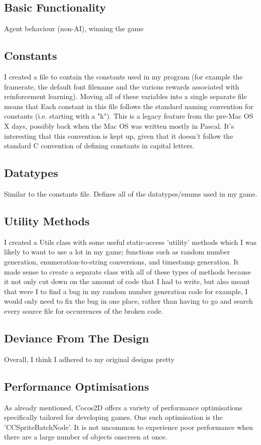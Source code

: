 \documentclass[a4paper,oneside]{report}
\begin{document}
\subsection{Basic Functionality} Agent behaviour (non-AI), winning the game

\subsection{Constants} I created a file to contain the constants used in my program (for example the framerate, the default font filename and the various rewards associated with reinforcement learning). Moving all of these variables into a single separate file means that Each constant in this file follows the standard naming convention for constants (i.e. starting with a "k"). This is a legacy feature from the pre-Mac OS X days, possibly back when the Mac OS was written mostly in Pascal. It's interesting that this convention is kept up, given that it doesn't follow the standard C convention of defining constants in capital letters. 

\subsection{Datatypes} Similar to the constants file. Defines all of the datatypes/enums used in my game.

\subsection{Utility Methods} I created a Utils class with some useful static-access 'utility' methods which I was likely to want to use a lot in my game; functions such as random number generation, enumeration-to-string conversions, and timestamp generation. It made sense to create a separate class with all of these types of methods because it not only cut down on the amount of code that I had to write, but also meant that were I to find a bug in my random number generation code for example, I would only need to fix the bug in one place, rather than having to go and search every source file for occurrences of the broken code. 
		
\subsection{Deviance From The Design} Overall, I think I adhered to my original designs pretty 

\subsection{Performance Optimisations} As already mentioned, Cocos2D offers a variety of performance optimisations specifically tailored for developing games. One such optimisation is the 'CCSpriteBatchNode'. It is not uncommon to experience poor performance when there are a large number of objects onscreen at once. 
\end{document}
